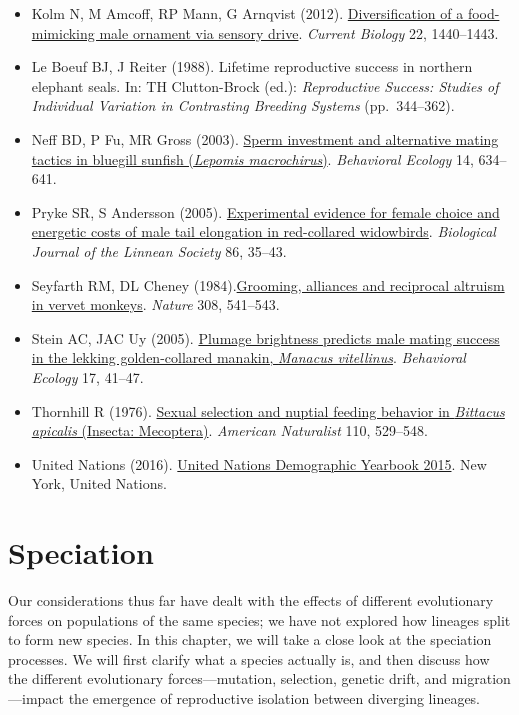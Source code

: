 \documentclass[
]{book}
\begin{document}
\begin{itemize}
\item
  Kolm N, M Amcoff, RP Mann, G Arnqvist (2012). \href{https://www.sciencedirect.com/science/article/pii/S0960982212006380?via\%3Dihub}{Diversification of a food-mimicking male ornament via sensory drive}. \emph{Current Biology} 22, 1440--1443.
\item
  Le Boeuf BJ, J Reiter (1988). Lifetime reproductive success in northern elephant seals. In: TH Clutton-Brock (ed.): \emph{Reproductive Success: Studies of Individual Variation in Contrasting Breeding Systems} (pp.~344--362).
\item
  Neff BD, P Fu, MR Gross (2003). \href{https://academic.oup.com/beheco/article/14/5/634/186409}{Sperm investment and alternative mating tactics in bluegill sunfish (\emph{Lepomis macrochirus})}. \emph{Behavioral Ecology} 14, 634--641.
\item
  Pryke SR, S Andersson (2005). \href{https://academic.oup.com/biolinnean/article/86/1/35/2691528}{Experimental evidence for female choice and energetic costs of male tail elongation in red-collared widowbirds}. \emph{Biological Journal of the Linnean Society} 86, 35--43.
\item
  Seyfarth RM, DL Cheney (1984).\href{https://www.nature.com/articles/308541a0}{Grooming, alliances and reciprocal altruism in vervet monkeys}. \emph{Nature} 308, 541--543.
\item
  Stein AC, JAC Uy (2005). \href{https://academic.oup.com/beheco/article/17/1/41/266852}{Plumage brightness predicts male mating success in the lekking golden-collared manakin, \emph{Manacus vitellinus}}. \emph{Behavioral Ecology} 17, 41--47.
\item
  Thornhill R (1976). \href{https://www.journals.uchicago.edu/doi/abs/10.1086/283089}{Sexual selection and nuptial feeding behavior in \emph{Bittacus apicalis} (Insecta: Mecoptera)}. \emph{American Naturalist} 110, 529--548.
\item
  United Nations (2016). \href{https://www.un-ilibrary.org/content/books/9789210584548}{United Nations Demographic Yearbook 2015}. New York, United Nations.
\end{itemize}

\hypertarget{speciation-1}{%
\chapter{Speciation}\label{speciation-1}}

Our considerations thus far have dealt with the effects of different evolutionary forces on populations of the same species; we have not explored how lineages split to form new species. In this chapter, we will take a close look at the speciation processes. We will first clarify what a species actually is, and then discuss how the different evolutionary forces---mutation, selection, genetic drift, and migration---impact the emergence of reproductive isolation between diverging lineages.
\end{document}
